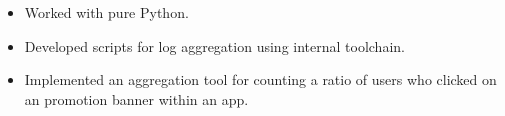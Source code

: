 \begin{itemize}
	\item Worked with pure Python.
    \item Developed scripts for log aggregation using internal toolchain.
    \item Implemented an aggregation tool for counting a ratio of users who clicked on an promotion banner within an app.
\end{itemize}
